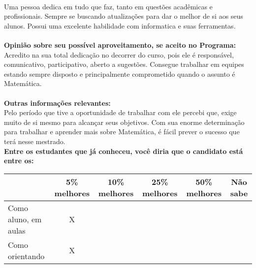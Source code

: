 \documentclass[11pt]{article}
\begin{document}
\\Uma pessoa dedica em tudo que faz, tanto em questões acadêmicas e profissionais. Sempre se buscando atualizações para dar o melhor de si aos seus alunos. Possui uma excelente habilidade com informatica e suas ferramentas.\\
\\
\textbf{Opinião sobre seu possível aproveitamento, se aceito no Programa:}
\\Acredito na sua total dedicação no decorrer do curso, pois ele é responsável, comunicativo, participativo, aberto a sugestões. Consegue trabalhar em equipes estando sempre disposto e principalmente comprometido quando o assunto é Matemática.\\ 
\\
\textbf{Outras informações relevantes:} \\Pelo período que tive a oportunidade de trabalhar com ele percebi que, exige muito de si mesmo para alcançar seus objetivos. Com sua enorme determinação para trabalhar e aprender mais sobre Matemática, é fácil prever o sucesso que terá nesse mestrado.
\\[0.3cm]
\textbf{Entre os estudantes que já conheceu, você diria que o candidato está entre os:}
\\
\begin{tabular}{|l|c|c|c|c|c|}
\hline
 & 5\% melhores & 10\% melhores & 25\% melhores & 50\% melhores & Não sabe \\
\hline
Como aluno, em aulas & X &  &  &  & \\
\hline
Como orientando & X &  &  &  & \\
\hline
\end{tabular}
\end{document}
